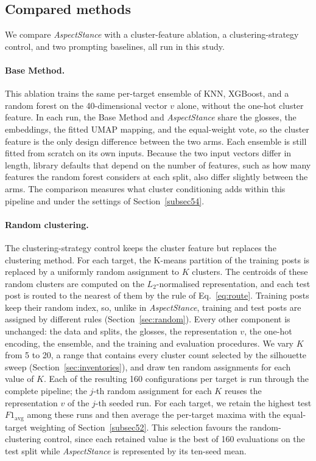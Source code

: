 \documentclass[pdflatex,sn-mathphys-num,iicol]{sn-jnl}%
\begin{document}
\subsection{Compared methods}\label{subsec53}
We compare \textit{AspectStance} with a cluster-feature ablation, a clustering-strategy control, and two prompting baselines, all run in this study.

\paragraph{Base Method.} This ablation trains the same per-target ensemble of KNN, XGBoost, and a random forest on the 40-dimensional vector \(v\) alone, without the one-hot cluster feature. In each run, the Base Method and \textit{AspectStance} share the glosses, the embeddings, the fitted UMAP mapping, and the equal-weight vote, so the cluster feature is the only design difference between the two arms. Each ensemble is still fitted from scratch on its own inputs. Because the two input vectors differ in length, library defaults that depend on the number of features, such as how many features the random forest considers at each split, also differ slightly between the arms. The comparison measures what cluster conditioning adds within this pipeline and under the settings of Section~\ref{subsec54}.

\paragraph{Random clustering.} The clustering-strategy control keeps the cluster feature but replaces the clustering method. For each target, the K-means partition of the training posts is replaced by a uniformly random assignment to \(K\) clusters. The centroids of these random clusters are computed on the \(L_2\)-normalised representation, and each test post is routed to the nearest of them by the rule of Eq.~\eqref{eq:route}. Training posts keep their random index, so, unlike in \textit{AspectStance}, training and test posts are assigned by different rules (Section~\ref{sec:random}). Every other component is unchanged: the data and splits, the glosses, the representation \(v\), the one-hot encoding, the ensemble, and the training and evaluation procedures. We vary \(K\) from 5 to 20, a range that contains every cluster count selected by the silhouette sweep (Section~\ref{sec:inventories}), and draw ten random assignments for each value of \(K\). Each of the resulting 160 configurations per target is run through the complete pipeline; the \(j\)-th random assignment for each \(K\) reuses the representation \(v\) of the \(j\)-th seeded run. For each target, we retain the highest test \(F1_{\mathrm{avg}}\) among these runs and then average the per-target maxima with the equal-target weighting of Section~\ref{subsec52}. This selection favours the random-clustering control, since each retained value is the best of 160 evaluations on the test split while \textit{AspectStance} is represented by its ten-seed mean.
\end{document}
